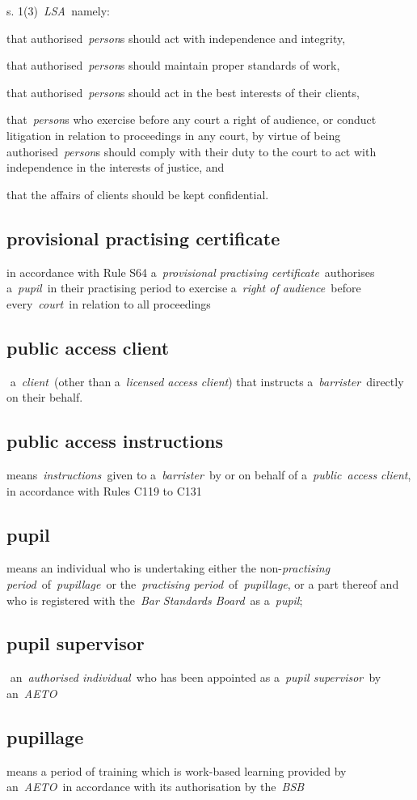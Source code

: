   s. 1(3)~\emph{LSA~}namely: \al \item that authorised~\emph{person}s should
  act with independence and integrity, \item that
  authorised~\emph{person}s should maintain proper standards of
  work, \item that authorised~\emph{person}s should act in the best
  interests of their clients, \item that~\emph{person}s who exercise
  before any court a right of audience, or conduct litigation in
  relation to proceedings in any court, by virtue of being
  authorised~\emph{person}s should comply with their duty to the court
  to act with independence in the interests of justice, and \item that the
  affairs of clients should be kept confidential.\la  \subsection{provisional practising certificate }
in accordance with Rule
  S64 a~\emph{provisional practising certificate}~authorises
  a~\emph{pupil}~in their practising period to exercise a~\emph{right of
  audience}~before every~\emph{court}~in relation to all proceedings  \subsection{public access client } a~\emph{client~}(other than
  a~\emph{licensed access client}) that instructs
  a~\emph{barrister~}directly on their behalf.  \subsection{public access instructions } means~\emph{instructions~}given
  to a~\emph{barrister~}by or on behalf of a~\emph{public~access
  client}, in accordance with Rules C119 to C131  \subsection{pupil } means an individual who is undertaking either the
  non-\emph{practising period}~of~\emph{pupillage~}or
  the~\emph{practising period}~of~\emph{pupillage}, or a part thereof
  and who is registered with the~\emph{Bar Standards Board}~as
  a~\emph{pupil};  \subsection{pupil supervisor } an~\emph{authorised individual~}who has
  been appointed as a~\emph{pupil supervisor~}by an~\emph{AETO} \subsection{pupillage } means a period of training which is work-based
  learning provided by an~\emph{AETO~}in accordance with its
  authorisation by the~\emph{BSB} 
  
